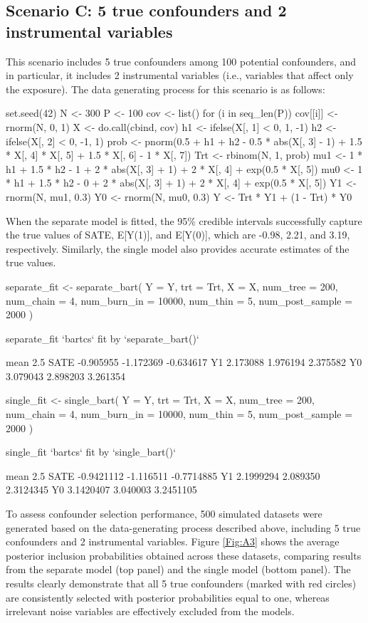 \subsection*{Scenario C: 5 true confounders and 2 instrumental variables}
This scenario includes 5 true confounders among 100 potential confounders, and in particular, it includes 2 instrumental variables (i.e., variables that affect only the exposure). The data generating process for this scenario is as follows:
\begin{example}
set.seed(42)
N <- 300
P <- 100
cov <- list()
for (i in seq_len(P)) {
  cov[[i]] <- rnorm(N, 0, 1)
}
X <- do.call(cbind, cov)
h1 <- ifelse(X[, 1] < 0, 1, -1)
h2 <- ifelse(X[, 2] < 0, -1, 1)
prob <- pnorm(0.5 + h1 + h2 - 0.5 * abs(X[, 3] - 1) +
                1.5 * X[, 4] * X[, 5] + 1.5 * X[, 6] - 1 * X[, 7])
Trt <- rbinom(N, 1, prob)
mu1 <- 1 * h1 + 1.5 * h2 - 1 + 2 * abs(X[, 3] + 1) +
  2 * X[, 4] + exp(0.5 * X[, 5]) 
mu0 <- 1 * h1 + 1.5 * h2 - 0 + 2 * abs(X[, 3] + 1) +
  2 * X[, 4] + exp(0.5 * X[, 5])
Y1 <- rnorm(N, mu1, 0.3)
Y0 <- rnorm(N, mu0, 0.3)
Y <- Trt * Y1 + (1 - Trt) * Y0
\end{example}
When the separate model is fitted, the 95\% credible intervals successfully capture the true values of SATE, E[Y(1)], and E[Y(0)], which are -0.98, 2.21, and 3.19, respectively. Similarly, the single model also provides accurate estimates of the true values.
\begin{example}
separate_fit <- separate_bart(
     Y = Y, trt = Trt, X = X, num_tree = 200, num_chain = 4,
     num_burn_in = 10000, num_thin = 5, num_post_sample = 2000
)

separate_fit
`bartcs` fit by `separate_bart()`

          mean      2.5%
SATE -0.905955 -1.172369 -0.634617
Y1    2.173088  1.976194  2.375582
Y0    3.079043  2.898203  3.261354
\end{example}
\begin{example}
single_fit <- single_bart(
     Y = Y, trt = Trt, X = X, num_tree = 200, num_chain = 4,
     num_burn_in = 10000, num_thin = 5, num_post_sample = 2000
)

single_fit
`bartcs` fit by `single_bart()`

           mean      2.5%
SATE -0.9421112 -1.116511 -0.7714885
Y1    2.1999294  2.089350  2.3124345
Y0    3.1420407  3.040003  3.2451105
\end{example}
To assess confounder selection performance, 500 simulated datasets were generated based on the data-generating process described above, including 5 true confounders and 2 instrumental variables. Figure \ref{Fig:A3} shows the average posterior inclusion probabilities obtained across these datasets, comparing results from the separate model (top panel) and the single model (bottom panel). The results clearly demonstrate that all 5 true confounders (marked with red circles) are consistently selected with posterior probabilities equal to one, whereas irrelevant noise variables are effectively excluded from the models.
